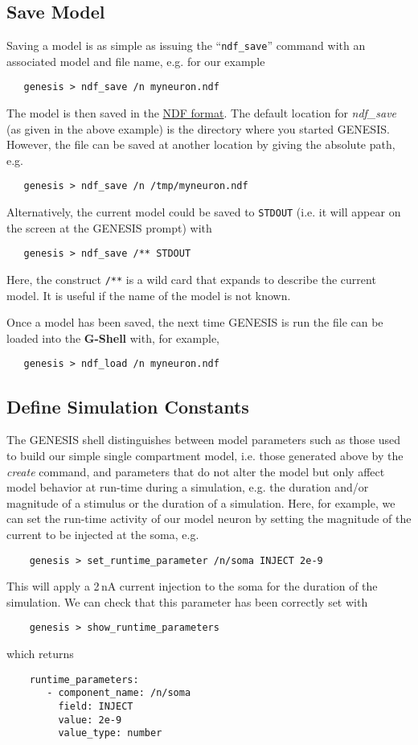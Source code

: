 \documentclass[12pt]{article}
\begin{document}
\subsection*{Save Model}

Saving a model is as simple as issuing the ``{\tt ndf\_save}'' command with an associated model and file name, e.g. for our example
\begin{verbatim}
   genesis > ndf_save /n myneuron.ndf
\end{verbatim}
The model is then saved in the \href{../ndf-file-format/ndf-file-format.tex}{NDF format}. The default location for {\it ndf\_save} (as given in the above example) is the directory where you started GENESIS. However, the file can be saved at another location by giving the absolute path, e.g.
\begin{verbatim}
   genesis > ndf_save /n /tmp/myneuron.ndf
\end{verbatim}
Alternatively, the current model could be saved to {\tt STDOUT} (i.e. it will appear on the screen at the GENESIS prompt) with
\begin{verbatim}
   genesis > ndf_save /** STDOUT
\end{verbatim}
Here, the construct {\tt /**} is a wild card that expands to describe the current model. It is useful if the name of the model is not known.

Once a model has been saved, the next time GENESIS is run the file can be loaded into the {\bf G-Shell} with, for example,
\begin{verbatim}
   genesis > ndf_load /n myneuron.ndf
\end{verbatim}

\subsection*{Define Simulation Constants}

The GENESIS shell distinguishes between model parameters such as those used to build our simple single compartment model, i.e. those generated above by the {\it create} command, and parameters that do not alter the model but only affect model behavior at run-time during a simulation, e.g. the duration and/or magnitude of a stimulus or the duration of a simulation. Here, for example, we can set the run-time activity of our model neuron by setting the magnitude of the current to be injected at the soma, e.g. 
\begin{verbatim}
    genesis > set_runtime_parameter /n/soma INJECT 2e-9
\end{verbatim}
This will apply a 2\,nA current injection to the soma for the duration of the simulation. We can check that this parameter has been correctly set with
\begin{verbatim}
    genesis > show_runtime_parameters
\end{verbatim}
which returns
\begin{verbatim}
    runtime_parameters:
       - component_name: /n/soma
         field: INJECT
         value: 2e-9
         value_type: number
\end{verbatim}
\end{document}
